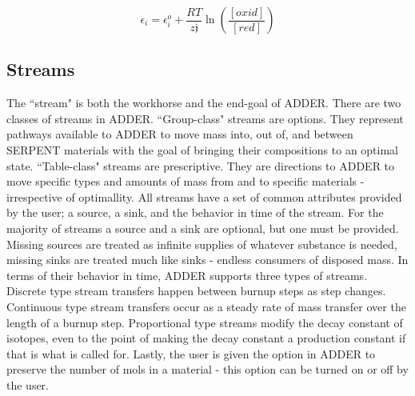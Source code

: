 \documentclass[]{elsarticle}
\def\j{\mathfrak{j}}
\begin{document}
\begin{equation}
\label{eq:nernst}
    \epsilon_{i} = \epsilon_{i}^{o} + \frac{RT}{z \j}\ln\left(\frac{[oxid]}{[red]}\right)
\end{equation}

\subsection{Streams} \label{ssec:streams}
The ``stream" is both the workhorse and the end-goal of ADDER.
There are two classes of streams in ADDER. ``Group-class" streams are
options. They represent pathways available to ADDER to move mass into, out of,
and between SERPENT materials with the goal of bringing their compositions to an
optimal state. ``Table-class" streams are prescriptive. They are directions to
ADDER to move specific types and amounts of mass from and to specific materials
 - irrespective of optimallity. All streams have a set of common attributes
provided by the user; a source, a sink, and the behavior in time of the stream.
For the majority of streams a source and a sink are optional, but one must be
provided. Missing sources are treated as infinite supplies of whatever substance
is needed, missing sinks are treated much like sinks - endless consumers of
disposed mass. In terms of their behavior in time, ADDER
supports three types of streams. Discrete type stream transfers happen
between burnup steps as step changes. Continuous type stream transfers occur as
a steady rate of mass transfer over the length of a burnup step. Proportional
type streams modify the decay constant
of isotopes, even to the point of making the decay constant a production
constant if that is what is called for. Lastly, the user is given the option in
ADDER to preserve the number of mols in a material - this option can be turned
on or off by the user.
\end{document}
